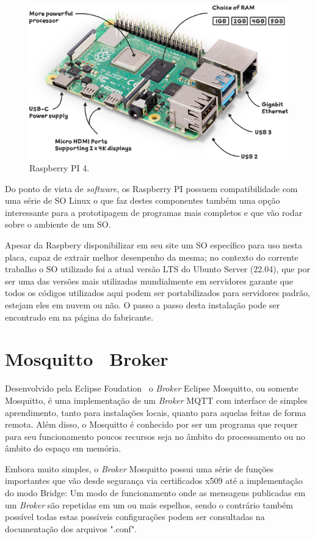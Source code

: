 \begin{figure}[htb]
    \begin{center}
	    \includegraphics[scale=0.5]{figs/raspberry-pi-4.png}
	\end{center}
	\caption{Raspberry PI 4.} 
\end{figure}

Do ponto de vista de \textit{software}, os Raspberry PI possuem compatibilidade com uma série de \ac{SO} Linux o que 
faz destes componentes também uma opção interessante para a prototipagem de programas mais completos e que vão rodar 
sobre o ambiente de um \ac{SO}.

Apesar da Raspbery disponibilizar em seu site um \ac{SO} específico para uso nesta placa, capaz de extrair melhor 
desenpenho da mesma; no contexto do corrente trabalho o \ac{SO} utilizado foi a atual versão \ac{LTS} do Ubunto Server (22.04),
que por ser uma das versões mais utilizadas mundialmente em servidores garante que todos os códigos utilizados aqui podem 
ser portabilizados para servidores padrão, estejam eles em nuvem ou não. O passo a passo desta instalação pode ser 
encontrado em na página do fabricante. \cite{ubunto-inst}

\section{Mosquitto\textregistered~ Broker}

Desenvolvido pela Eclipse Foudation\textregistered~ o \textit{Broker} Eclipse Mosquitto, ou somente Mosquitto, é uma 
implementação de um \textit{Broker} \ac{MQTT} com interface de simples aprendimento, tanto para instalações locais,
quanto para aquelas feitas de forma remota. Além disso, o Mosquitto é conhecido por ser um programa que requer para 
seu funcionamento poucos recursos seja no âmbito do processamento ou no âmbito do espaço em memória.

Embora muito simples, o \textit{Broker} Mosquitto possui uma série de funções importantes que vão desde segurança via 
certificados x509 até a implementação do modo Bridge: Um modo de funcionamento onde as mensagens publicadas em um 
\textit{Broker} são repetidas em um ou mais espelhos, sendo o contrário também possível todas estas possíveis configurações
podem ser consultadas na documentação dos arquivos ".conf". \cite{mosq-doc}
 
